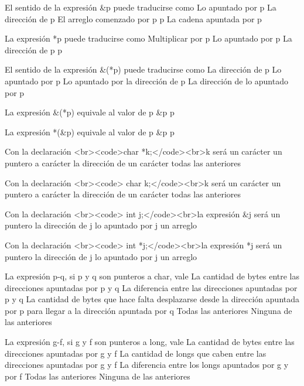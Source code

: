 
\question El sentido de la expresión &p puede traducirse como
\choice Lo apuntado por p
\correctchoice La dirección de p
\choice El arreglo comenzado por p
\choice *p
\choice La cadena apuntada por p

\question La expresión *p puede traducirse como
\choice Multiplicar por p
\correctchoice Lo apuntado por p
\choice La dirección de p
\choice p

\question El sentido de la expresión &(*p) puede traducirse como
\choice La dirección de p
\choice Lo apuntado por p
\choice Lo apuntado por la dirección de p
\correctchoice La dirección de lo apuntado por p

\question La expresión &(*p) equivale al valor de 
\choice *p
\choice &p
\correctchoice p

\question La expresión *(&p) equivale al valor de 
\choice *p
\choice &p
\correctchoice p

\question Con la declaración <br><code>char *k;</code><br>k será
\choice un carácter
\correctchoice un puntero a carácter
\choice la dirección de un carácter
\choice todas las anteriores

\question Con la declaración <br><code> char k;</code><br>k será
\correctchoice un carácter 
\choice un puntero a carácter
\choice la dirección de un carácter
\choice todas las anteriores

\question Con la declaración <br><code> int j;</code><br>la expresión &j será
\choice un puntero
\correctchoice la dirección de j
\choice lo apuntado por j
\choice un arreglo

\question Con la declaración <br><code> int *j;</code><br>la expresión *j será
\choice un puntero
\choice la dirección de j
\correctchoice lo apuntado por j
\choice un arreglo

\question La expresión p-q, si p y q son punteros a char, vale
\choice La cantidad de bytes entre las direcciones apuntadas por p y q
\choice La diferencia entre las direcciones apuntadas por p y q
\choice La cantidad de bytes que hace falta desplazarse desde la dirección apuntada por p para llegar a la dirección apuntada por q
\correctchoice Todas las anteriores
\choice Ninguna de las anteriores

\question La expresión g-f, si g y f son punteros a long, vale
\choice La cantidad de bytes entre las direcciones apuntadas por g y f
\correctchoice La cantidad de longs que caben entre las direcciones apuntadas por g y f
\choice La diferencia entre los longs apuntados por g y por f
\choice Todas las anteriores
\choice Ninguna de las anteriores


